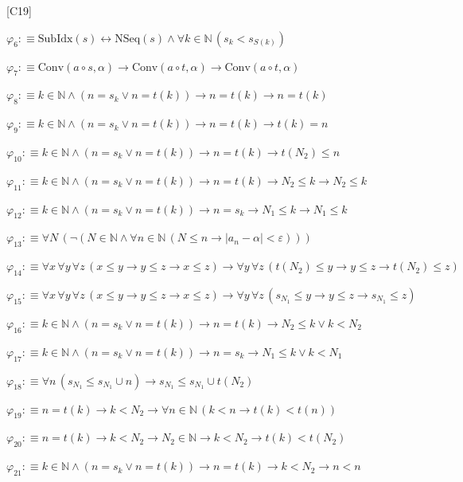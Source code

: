 \begin{fullproof}{[C19]}
\begin{abbrevlist}
\item $\varphi_{6} :\equiv \mathrm{SubIdx}(s) \leftrightarrow \mathrm{NSeq}(s) \land \forall k \in \mathbb{N}\,(s_{k} < s_{S(k)})$
\item $\varphi_{7} :\equiv \mathrm{Conv}(a \circ s,\alpha) \to \mathrm{Conv}(a \circ t,\alpha) \to \mathrm{Conv}(a \circ t,\alpha)$
\item $\varphi_{8} :\equiv k \in \mathbb{N} \land (n = s_{k} \lor n = t(k)) \to n = t(k) \to n = t(k)$
\item $\varphi_{9} :\equiv k \in \mathbb{N} \land (n = s_{k} \lor n = t(k)) \to n = t(k) \to t(k) = n$
\item $\varphi_{10} :\equiv k \in \mathbb{N} \land (n = s_{k} \lor n = t(k)) \to n = t(k) \to t(N_{2}) \leq n$
\item $\varphi_{11} :\equiv k \in \mathbb{N} \land (n = s_{k} \lor n = t(k)) \to n = t(k) \to N_{2} \leq k \to N_{2} \leq k$
\item $\varphi_{12} :\equiv k \in \mathbb{N} \land (n = s_{k} \lor n = t(k)) \to n = s_{k} \to N_{1} \leq k \to N_{1} \leq k$
\item $\varphi_{13} :\equiv \forall N\,(\neg (N \in \mathbb{N} \land \forall n \in \mathbb{N}\,(N \leq n \to \lvert a_{n} - \alpha \rvert < \varepsilon)))$
\item $\varphi_{14} :\equiv \forall x\,\forall y\,\forall z\,(x \leq y \to y \leq z \to x \leq z) \to \forall y\,\forall z\,(t(N_{2}) \leq y \to y \leq z \to t(N_{2}) \leq z)$
\item $\varphi_{15} :\equiv \forall x\,\forall y\,\forall z\,(x \leq y \to y \leq z \to x \leq z) \to \forall y\,\forall z\,(s_{N_{1}} \leq y \to y \leq z \to s_{N_{1}} \leq z)$
\item $\varphi_{16} :\equiv k \in \mathbb{N} \land (n = s_{k} \lor n = t(k)) \to n = t(k) \to N_{2} \leq k \lor k < N_{2}$
\item $\varphi_{17} :\equiv k \in \mathbb{N} \land (n = s_{k} \lor n = t(k)) \to n = s_{k} \to N_{1} \leq k \lor k < N_{1}$
\item $\varphi_{18} :\equiv \forall n\,(s_{N_{1}} \leq s_{N_{1}} \cup n) \to s_{N_{1}} \leq s_{N_{1}} \cup t(N_{2})$
\item $\varphi_{19} :\equiv n = t(k) \to k < N_{2} \to \forall n \in \mathbb{N}\,(k < n \to t(k) < t(n))$
\item $\varphi_{20} :\equiv n = t(k) \to k < N_{2} \to N_{2} \in \mathbb{N} \to k < N_{2} \to t(k) < t(N_{2})$
\item $\varphi_{21} :\equiv k \in \mathbb{N} \land (n = s_{k} \lor n = t(k)) \to n = t(k) \to k < N_{2} \to n < n$

\end{abbrevlist}
\end{fullproof}

